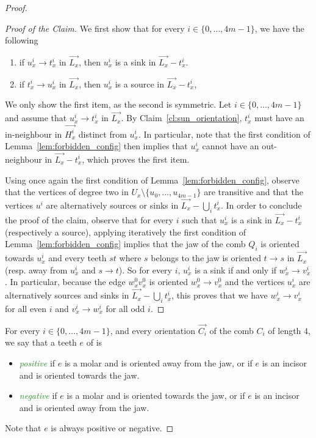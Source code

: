 \documentclass[11pt,a4aper]{article}
\newenvironment{poc}{\begin{proof}[Proof of the
    Claim]\renewcommand*{\qedsymbol}{$\blacksquare$}}{\end{proof}}
\DeclareRobustCommand*{\ora}{\overrightarrow}
\newcommand*{\orCi}{\ora{C_i}}
\newcommand*{\orHxi}{\ora{H_x^i}}
\newcommand*{\orLx}{\ora{L_x}}
\newcommand{\defin}[1]{\emph{\textcolor{ForestGreen}{#1}}}
\begin{document}
\begin{proof}
\begin{poc}
    We first show that for every $i\in \{0,\ldots,4m-1\}$, we have the following
    \begin{enumerate}
    \item\label{item:sink} if $u^{i}_x \to t^{i}_x$ in $\orLx$, then $u^{i}_x$
      is a sink in $\orLx-t_x^{i}$.
    \item\label{item:source} if $t^{i}_x \to u^{i}_x$ in $\orLx$, then $u^{i}_x$
      is a source in $\orLx-t_x^{i}$,
    \end{enumerate}
    We only show the first item, as the second is symmetric. Let
    $i \in \{0,\ldots,4m-1\}$ and assume that $u^{i}_x \to t^{i}_x$ in
    $\orLx$. By Claim~\ref{cl:sun_orientation}, $t^{i}_x$ must
    have an in-neighbour in $\orHxi$ distinct from $u_x^{i}$. In
    particular, note that the first condition of Lemma~\ref{lem:forbidden_config}
    then implies that $u^{i}_x$ cannot have an out-neighbour in
    $\orLx-t^{i}_x$, which proves the first item.
    
    Using once again the first condition of Lemma~\ref{lem:forbidden_config}, observe
    that the vertices of degree two in $U_x \setminus \{u_0, \dots, u_{4m-1}\}$
    are transitive and that the vertices $u^{i}$ are alternatively sources or
    sinks in $\orLx - \bigcup_it^i_x$. In order to conclude the proof of the
    claim, observe that for every $i$ such that $u^i_x$ is a sink in $\orLx - t^i_x$
    (respectively a source), applying iteratively the first condition of
    Lemma~\ref{lem:forbidden_config} implies that the jaw of the comb $Q_i$ is
    oriented towards $u^i_x$ and every teeth $st$ where $s$ belongs to the jaw is
    oriented $t \to s$ in $\orLx$ (resp. away from $u^i_x$ and $s \to t$). So
    for every $i$, $u^i_x$ is a sink if and only if $w^i_x \to v^i_x$.  In
    particular, because the edge $w^0_xv^0_x$ is oriented $w^0_x \to v^0_x$ and
    the vertices $u^i_x$ are alternatively sources and sinks in
    $\orLx - \bigcup_it^i_x$, this proves that we have $w^i_x \to v^i_x$ for all
    even $i$ and $v^i_x \to w^i_x$ for all odd $i$.
  \end{poc}
  
  For every $i\in \{0,\ldots,4m-1\}$, and every orientation $\orCi$ of the comb $C_i$ of length $4$, we say that a teeth $e$ of is 
  \begin{itemize}
  \item \defin{positive} if $e$ is a molar and is oriented away from the jaw, or
    if $e$ is an incisor and is oriented towards the jaw.
   \item \defin{negative} if $e$ is a molar and is oriented towards the jaw, or
     if $e$ is an incisor and is oriented away from the jaw.
  \end{itemize}
Note that $e$ is always positive or negative.
  

\end{proof}
\end{document}
